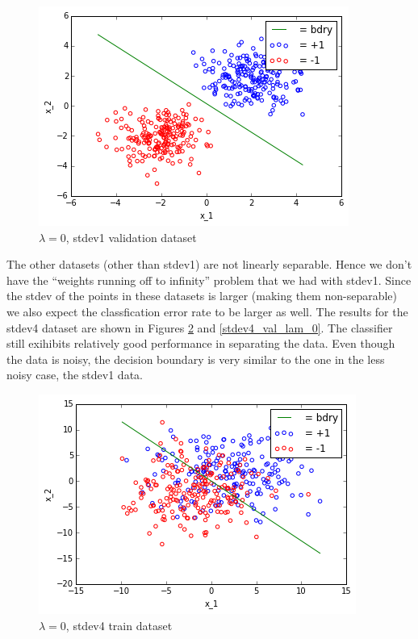\documentclass[10pt]{article}
\begin{document}
\begin{figure}
 \centering
 \includegraphics[scale=0.5]{stdev1_val_lam_0.png}
 
 \caption{$\lambda = 0$, stdev1 validation dataset}
 \label{stdev1_val_lam_0}
 \end{figure}

The other datasets (other than stdev1) are not linearly separable. Hence we don't have the ``weights running off to infinity'' problem that we had with stdev1. Since the stdev of the points in these datasets is larger (making them non-separable) we also expect the classfication error rate to be larger as well. The results for the stdev4 dataset are shown in Figures \ref{stdev4_train_lam_0} and \ref{stdev4_val_lam_0}. The classifier still exihibits relatively good performance in separating the data. Even though the data is noisy, the decision boundary is very similar to the one in the less noisy case, the stdev1 data.
\begin{figure}
 \centering
 \includegraphics[scale=0.5]{stdev4_train_lam_0.png}
 
 \caption{$\lambda = 0$, stdev4 train dataset}
 \label{stdev4_train_lam_0}
 \end{figure}
\end{document}
